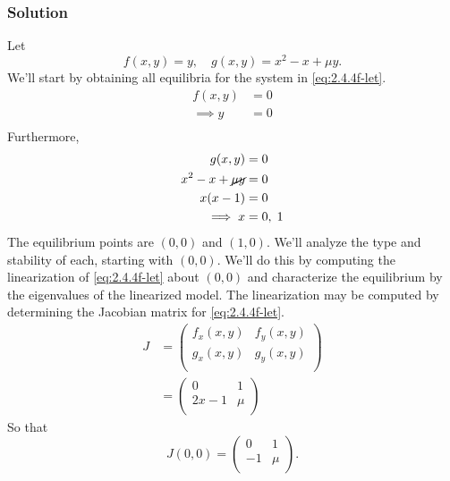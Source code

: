 \documentclass[12pt,twoside]{article}
\begin{document}
\subsubsection*{Solution}
Let
\begin{equation}
  \label{eq:2.4.4f-let}
  f(x,y) = y,\quad g(x,y) = x^2-x+\mu y.
\end{equation}
We'll start by obtaining all equilibria for the system in \cref{eq:2.4.4f-let}.
\begin{equation*}
  \begin{aligned}
    f(x,y) &= 0 \\
    \implies y&=0 \\
  \end{aligned}
\end{equation*}
Furthermore,
\begin{equation*}
  \begin{aligned}
    g(x,y) &= 0 \\
    x^2-x+\cancel{\mu y} &= 0 \\
    x(x-1) &= 0 \\
    \implies x &= 0,\;1 \\
  \end{aligned}
\end{equation*}
The equilibrium points are $(0,0)$ and $(1,0)$. We'll analyze the type and
stability of each, starting with $(0,0)$. We'll do this by computing the
linearization of \cref{eq:2.4.4f-let} about $(0,0)$ and characterize the
equilibrium by the eigenvalues of the linearized model. The linearization may be
computed by determining the Jacobian matrix for \cref{eq:2.4.4f-let}.
\begin{equation*}
  \begin{aligned}
    J &= \begin{pmatrix}
    f_x(x,y) & f_y(x,y) \\
    g_x(x,y) & g_y(x,y) \\
  \end{pmatrix} \\
  &=
  \begin{pmatrix}
    0 & 1 \\ 2x-1 & \mu \\
  \end{pmatrix}
  \end{aligned}
\end{equation*}
So that
\begin{equation*}
  J(0,0) =
  \begin{pmatrix}
    0 & 1 \\ -1 & \mu \\
  \end{pmatrix}.
\end{equation*}
\end{document}

